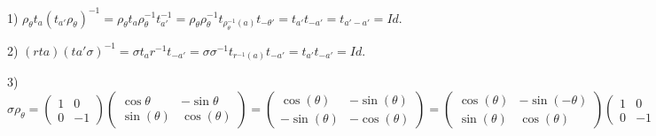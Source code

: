 \documentclass[algebra_notes.tex]{subfiles}
\begin{document}
\begin{proof*}

	1) $\rho_{\theta }t_{a}(t_{a'}\rho_{\theta })^{-1} = \rho_{\theta }t_{a}\rho_{\theta }^{-1}t_{a'}^{-1} = \rho_{\theta }\rho_{\theta }^{-1}t_{\rho_{\theta }^{-1}(a)}t_{-\theta '}
		= t_{a'}t_{-a'} = t_{a'-a'} = Id.$

	2) $(rta)(ta'\sigma )^{-1} = \sigma t_{a}r^{-1}t_{-a'} = \sigma \sigma^{-1}t_{r^{-1}(a)}t_{-a'} = t_{a'}t_{-a'} = Id.$

	3) $\sigma \rho_{\theta } = \begin{pmatrix}
			1 & 0  \\
			0 & -1
		\end{pmatrix}\begin{pmatrix}
			\cos{\theta }   & -\sin{\theta }  \\
			\sin{(\theta )} & \cos{(\theta )}
		\end{pmatrix} = \begin{pmatrix}
			\cos{(\theta )}  & -\sin{(\theta )} \\
			-\sin{(\theta )} & -\cos{(\theta )}
		\end{pmatrix} = \begin{pmatrix}
			\cos{(\theta )} & -\sin{(-\theta )} \\
			\sin{(\theta )} & \cos{(\theta )}
		\end{pmatrix}\begin{pmatrix}
			1 & 0  \\
			0 & -1
		\end{pmatrix} = \rho_{-\theta }\sigma.$ \qedsymbol
\end{proof*}
\newpage
\end{document}
